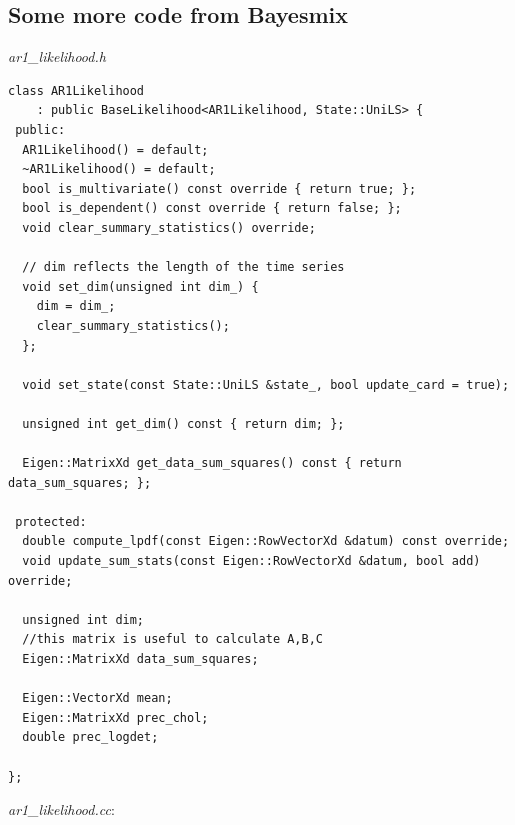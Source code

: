 \documentclass[12pt,a4paper]{article}
\begin{document}
\subsection{Some more code from Bayesmix}\label{code}
\textit{ar1\_likelihood.h}
\begin{lstlisting} 
class AR1Likelihood
    : public BaseLikelihood<AR1Likelihood, State::UniLS> {
 public:
  AR1Likelihood() = default;
  ~AR1Likelihood() = default;
  bool is_multivariate() const override { return true; };
  bool is_dependent() const override { return false; };
  void clear_summary_statistics() override;

  // dim reflects the length of the time series
  void set_dim(unsigned int dim_) {
    dim = dim_;
    clear_summary_statistics();
  };

  void set_state(const State::UniLS &state_, bool update_card = true);

  unsigned int get_dim() const { return dim; };

  Eigen::MatrixXd get_data_sum_squares() const { return data_sum_squares; };

 protected:
  double compute_lpdf(const Eigen::RowVectorXd &datum) const override;
  void update_sum_stats(const Eigen::RowVectorXd &datum, bool add) override;

  unsigned int dim;
  //this matrix is useful to calculate A,B,C
  Eigen::MatrixXd data_sum_squares;

  Eigen::VectorXd mean;
  Eigen::MatrixXd prec_chol;
  double prec_logdet;

};
\end{lstlisting}
\textit{ar1\_likelihood.cc}:
\end{document}
